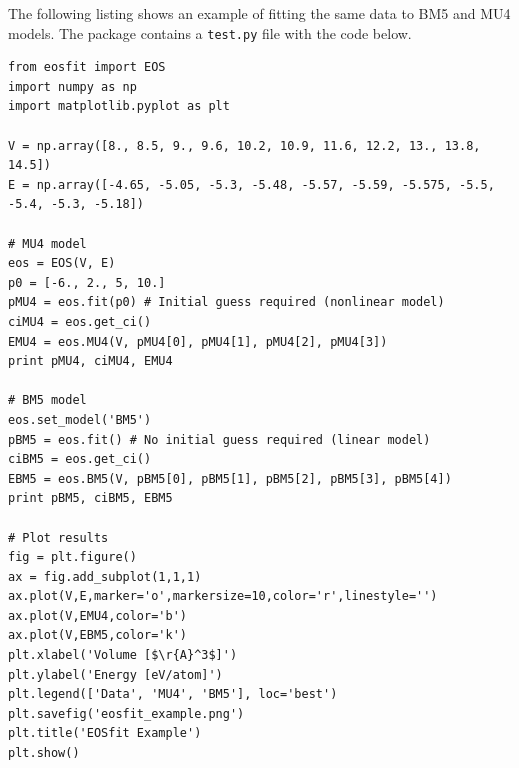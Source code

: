 \documentclass[letter, 12pt]{article}
\begin{document}
The following listing shows an example of fitting the same data to BM5 and MU4 models. The package contains a \texttt{test.py} file with the code below.
\begin{lstlisting}
from eosfit import EOS
import numpy as np
import matplotlib.pyplot as plt

V = np.array([8., 8.5, 9., 9.6, 10.2, 10.9, 11.6, 12.2, 13., 13.8, 14.5])
E = np.array([-4.65, -5.05, -5.3, -5.48, -5.57, -5.59, -5.575, -5.5, -5.4, -5.3, -5.18])

# MU4 model
eos = EOS(V, E)
p0 = [-6., 2., 5, 10.]
pMU4 = eos.fit(p0) # Initial guess required (nonlinear model)
ciMU4 = eos.get_ci()
EMU4 = eos.MU4(V, pMU4[0], pMU4[1], pMU4[2], pMU4[3])
print pMU4, ciMU4, EMU4

# BM5 model
eos.set_model('BM5')
pBM5 = eos.fit() # No initial guess required (linear model)
ciBM5 = eos.get_ci()
EBM5 = eos.BM5(V, pBM5[0], pBM5[1], pBM5[2], pBM5[3], pBM5[4])
print pBM5, ciBM5, EBM5

# Plot results
fig = plt.figure()
ax = fig.add_subplot(1,1,1)
ax.plot(V,E,marker='o',markersize=10,color='r',linestyle='')
ax.plot(V,EMU4,color='b')
ax.plot(V,EBM5,color='k')
plt.xlabel('Volume [$\r{A}^3$]')
plt.ylabel('Energy [eV/atom]')
plt.legend(['Data', 'MU4', 'BM5'], loc='best')
plt.savefig('eosfit_example.png')
plt.title('EOSfit Example')
plt.show()
\end{lstlisting}
\end{document}
